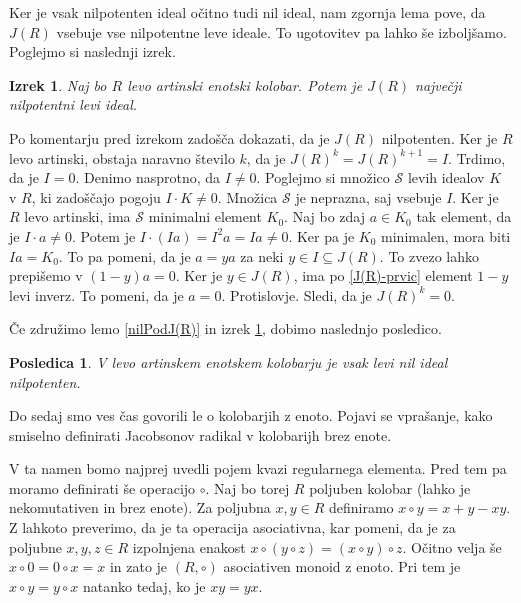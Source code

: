\documentclass[a4paper, 12pt]{amsart}
\theoremstyle{definition} %
\theoremstyle{plain} %
\newtheorem{izrek}[definicija]{Izrek}
\newtheorem{posledica}[definicija]{Posledica}
\begin{document}
Ker je vsak nilpotenten ideal očitno tudi nil ideal, nam zgornja lema pove, da $J(R)$ vsebuje vse nilpotentne leve ideale. To ugotovitev pa lahko še izboljšamo. Poglejmo si naslednji izrek.

\begin{izrek}
\label{J(R)nilpotenten-levoArtinski}
Naj bo $R$ levo artinski enotski kolobar. Potem je $J(R)$ največji nilpotentni levi ideal.
\end{izrek}

\proof
Po komentarju pred izrekom zadošča dokazati, da je $J(R)$ nilpotenten. Ker je $R$ levo artinski, obstaja naravno število $k$, da je $J(R)^k = J(R) ^{k+1} = I$. Trdimo, da je $I=0$. Denimo nasprotno, da $I\neq 0$. Poglejmo si množico $\mathcal{S}$ levih idealov $K$ v $R$, ki zadoščajo pogoju $I\cdot K \neq 0$. Množica $\mathcal{S}$ je neprazna, saj vsebuje $I$. Ker je $R$ levo artinski, ima $\mathcal{S}$ minimalni element $K_0$. Naj bo zdaj $a\in K_0$ tak element, da je $I\cdot a \neq 0$. Potem je $I\cdot (Ia) = I^2 a = Ia \neq 0$. Ker pa je $K_0$ minimalen, mora biti $Ia = K_0$. To pa pomeni, da je $a = ya$ za neki $y\in I \subseteq J(R)$. To zvezo lahko prepišemo v $(1-y)a = 0$. Ker je $y\in J(R)$, ima po \ref{J(R)-prvic} element $1-y$ levi inverz. To pomeni, da je $a=0$. Protislovje. Sledi, da je $J(R)^k = 0$.
\endproof

Če združimo lemo \ref{nilPodJ(R)} in izrek \ref{J(R)nilpotenten-levoArtinski}, dobimo naslednjo posledico.

\begin{posledica}
V levo artinskem enotskem kolobarju je vsak levi nil ideal nilpotenten.
\end{posledica}

Do sedaj smo ves čas govorili le o kolobarjih z enoto. Pojavi se vprašanje, kako smiselno definirati Jacobsonov radikal v kolobarijh brez enote. 

V ta namen bomo najprej uvedli pojem kvazi regularnega elementa. Pred tem pa moramo definirati še operacijo $\circ$. Naj bo torej $R$ poljuben kolobar (lahko je nekomutativen in brez enote). Za poljubna $x,y\in R$ definiramo $x\circ y = x+y-xy$. Z lahkoto preverimo, da je ta operacija asociativna, kar pomeni, da je za poljubne $x,y,z\in R$ izpolnjena enakost $x\circ(y\circ z) = (x\circ y) \circ z$. Očitno velja še $x \circ 0 = 0 \circ x = x$ in zato je $(R,\circ )$ asociativen monoid z enoto. Pri tem je $x\circ y = y\circ x$ natanko tedaj, ko je $xy = yx$.
\end{document}
